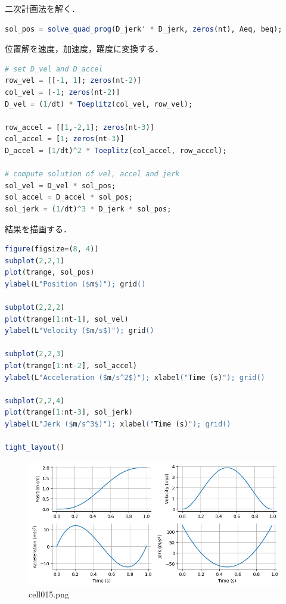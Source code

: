 二次計画法を解く．
\begin{lstlisting}[language=julia]
sol_pos = solve_quad_prog(D_jerk' * D_jerk, zeros(nt), Aeq, beq);
\end{lstlisting}
位置解を速度，加速度，躍度に変換する．
\begin{lstlisting}[language=julia]
# set D_vel and D_accel
row_vel = [[-1, 1]; zeros(nt-2)]
col_vel = [-1; zeros(nt-2)]
D_vel = (1/dt) * Toeplitz(col_vel, row_vel);

row_accel = [[1,-2,1]; zeros(nt-3)] 
col_accel = [1; zeros(nt-3)]
D_accel = (1/dt)^2 * Toeplitz(col_accel, row_accel);

# compute solution of vel, accel and jerk
sol_vel = D_vel * sol_pos;
sol_accel = D_accel * sol_pos;
sol_jerk = (1/dt)^3 * D_jerk * sol_pos;
\end{lstlisting}
結果を描画する．
\begin{lstlisting}[language=julia]
figure(figsize=(8, 4))
subplot(2,2,1)
plot(trange, sol_pos)
ylabel(L"Position ($m$)"); grid()

subplot(2,2,2)
plot(trange[1:nt-1], sol_vel)
ylabel(L"Velocity ($m/s$)"); grid()

subplot(2,2,3)
plot(trange[1:nt-2], sol_accel)
ylabel(L"Acceleration ($m/s^2$)"); xlabel("Time (s)"); grid()

subplot(2,2,4)
plot(trange[1:nt-3], sol_jerk)
ylabel(L"Jerk ($m/s^3$)"); xlabel("Time (s)"); grid()

tight_layout()
\end{lstlisting}
\begin{figure}[ht]
	\centering
	\includegraphics[scale=0.8, max width=\linewidth]{./fig/motor-learning/minimum-jerk/cell015.png}
	\caption{cell015.png}
	\label{cell015.png}
\end{figure}
